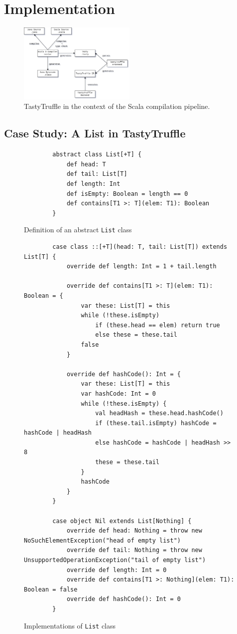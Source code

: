\chapter{Implementation}


\begin{figure}[H]
	\centering
	\includegraphics[width=0.5\textwidth]{figures/tastytruffle-pipeline.png}
	\caption{TastyTruffle in the context of the Scala compilation pipeline.}
\end{figure}

\section{Case Study: A List in TastyTruffle}

\begin{figure}[H]
	\begin{verbatim}
		abstract class List[+T] {
			def head: T
			def tail: List[T]
			def length: Int
			def isEmpty: Boolean = length == 0
			def contains[T1 >: T](elem: T1): Boolean
		}
	\end{verbatim}
	\caption{Definition of an abstract \texttt{List} class}
\end{figure}

\begin{figure}[H]
	\begin{verbatim}
		case class ::[+T](head: T, tail: List[T]) extends List[T] {
			override def length: Int = 1 + tail.length
			
			override def contains[T1 >: T](elem: T1): Boolean = {
				var these: List[T] = this
				while (!these.isEmpty) 
					if (these.head == elem) return true
					else these = these.tail
				false
			}
			
			override def hashCode(): Int = {
				var these: List[T] = this
				var hashCode: Int = 0
				while (!these.isEmpty) {
					val headHash = these.head.hashCode()
					if (these.tail.isEmpty) hashCode = hashCode | headHash
					else hashCode = hashCode | headHash >> 8
					these = these.tail
				}
				hashCode
			}
		}
		
		case object Nil extends List[Nothing] {
			override def head: Nothing = throw new NoSuchElementException("head of empty list")
			override def tail: Nothing = throw new UnsupportedOperationException("tail of empty list")
			override def length: Int = 0
			override def contains[T1 >: Nothing](elem: T1): Boolean = false
			override def hashCode(): Int = 0
		}
	\end{verbatim}
	\caption{Implementations of \texttt{List} class}
\end{figure}


